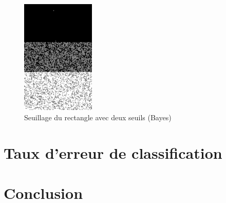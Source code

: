 \documentclass[a4paper,11pt]{article}
\begin{document}
  \begin{figure}[H]
    \center
    \includegraphics[width=3.5cm]{resultat/bin3Classes.png}
    \caption{Seuillage du rectangle avec deux seuils (Bayes)}
  \end{figure}
  
  \section{Taux d’erreur de classification}
  
  \section*{Conclusion}
 
    
\end{document}
